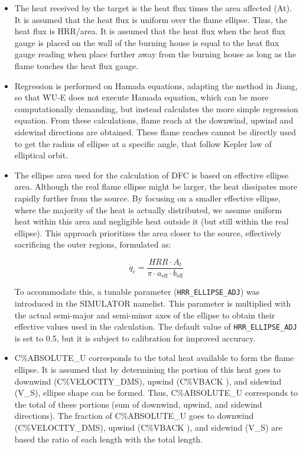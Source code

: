 \begin{itemize}
    \item The heat received by the target is the heat flux times the area affected (At). It is assumed that the heat flux is uniform over the flame ellipse. Thus, the heat flux is HRR/area. It is assumed that the heat flux when the heat flux gauge is placed on the wall of the burning house is equal to the heat flux gauge reading when place further away from the burning house as long as the flame touches the heat flux gauge.
    \item Regression is performed on Hamada equations, adapting the method in Jiang, so that WU-E does not execute Hamada equation, which can be more computationally demanding, but instead calculates the more simple regression equation. From these calculations, flame reach at the downwind, upwind and sidewind directions are obtained. These flame reaches cannot be directly used to get the radius of ellipse at a specific angle, that follow Kepler law of elliptical orbit.

    \item The ellipse area used for the calculation of DFC is based on effective ellipse area. Although the real flame ellipse might be larger, the heat dissipates more rapidly further from the source. By focusing on a smaller effective ellipse, where the majority of the heat is actually distributed, we assume uniform heat within this area and negligible heat outside it (but still within the real ellipse). This approach prioritizes the area closer to the source, effectively sacrificing the outer regions, formulated as:
    
    \[
    \dot{q}_c = \frac{HRR \cdot A_t}{\pi \cdot a_{\text{eff}} \cdot b_{\text{eff}}}
    \]
    
    To accommodate this, a tunable parameter (\texttt{HRR\_ELLIPSE\_ADJ}) was introduced in the SIMULATOR namelist. This parameter is multiplied with the actual semi-major and semi-minor axes of the ellipse to obtain their effective values used in the calculation. The default value of \texttt{HRR\_ELLIPSE\_ADJ} is set to 0.5, but it is subject to calibration for improved accuracy.
       
    \item C\%ABSOLUTE\_U corresponds to the total heat available to form the flame ellipse. It is assumed that by determining the portion of this heat goes to downwind (C\%VELOCITY\_DMS), upwind (C\%VBACK ), and sidewind (V\_S), ellipse shape can be formed. Thus, C\%ABSOLUTE\_U corresponds to the total of these portions (sum of downwind, upwind, and sidewind directions). The fraction of C\%ABSOLUTE\_U goes to downwind (C\%VELOCITY\_DMS), upwind (C\%VBACK ), and sidewind (V\_S) are based the ratio of each length with the total length.
\end{itemize}

